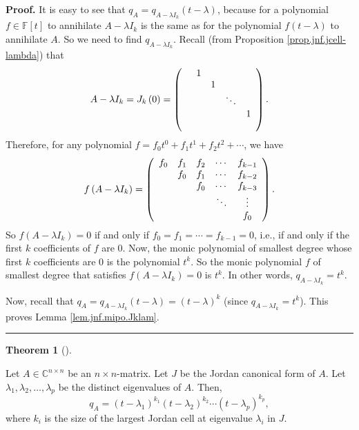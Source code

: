 \documentclass[numbers=enddot,12pt,final,onecolumn,notitlepage]{scrartcl}%
\numberwithin{exer}{subsection}
\theoremstyle{definition}
\newtheorem{theo}{Theorem}[subsection]
\newenvironment{theorem}[1][]
{\begin{theo}[#1]\begin{leftbar}}
{\end{leftbar}\end{theo}}
\newenvironment{proof}[1][Proof]{\noindent\textbf{#1.} }{\ \rule{0.5em}{0.5em}}
\begin{document}
\begin{proof}
It is easy to see that $q_{A}=q_{A-\lambda I_{k}}\left(  t-\lambda\right)  $,
because for a polynomial $f\in\mathbb{F}\left[  t\right]  $ to annihilate
$A-\lambda I_{k}$ is the same as for the polynomial $f\left(  t-\lambda
\right)  $ to annihilate $A$. So we need to find $q_{A-\lambda I_{k}}$. Recall
(from Proposition \ref{prop.jnf.jcell-lambda}) that
\[
A-\lambda I_{k}=J_{k}\left(  0\right)  =\left(
\begin{array}
[c]{ccccc}
& 1 &  &  & \\
&  & 1 &  & \\
&  &  & \ddots & \\
&  &  &  & 1\\
&  &  &  &
\end{array}
\right)  .
\]
Therefore, for any polynomial $f=f_{0}t^{0}+f_{1}t^{1}+f_{2}t^{2}+\cdots$, we
have%
\[
f\left(  A-\lambda I_{k}\right)  =\left(
\begin{array}
[c]{ccccc}%
f_{0} & f_{1} & f_{2} & \cdots & f_{k-1}\\
& f_{0} & f_{1} & \cdots & f_{k-2}\\
&  & f_{0} & \cdots & f_{k-3}\\
&  &  & \ddots & \vdots\\
&  &  &  & f_{0}%
\end{array}
\right)  .
\]
So $f\left(  A-\lambda I_{k}\right)  =0$ if and only if $f_{0}=f_{1}%
=\cdots=f_{k-1}=0$, i.e., if and only if the first $k$ coefficients of $f$ are
$0$. Now, the monic polynomial of smallest degree whose first $k$ coefficients
are $0$ is the polynomial $t^{k}$. So the monic polynomial $f$ of smallest
degree that satisfies $f\left(  A-\lambda I_{k}\right)  =0$ is $t^{k}$. In
other words, $q_{A-\lambda I_{k}}=t^{k}$.

Now, recall that $q_{A}=q_{A-\lambda I_{k}}\left(  t-\lambda\right)  =\left(
t-\lambda\right)  ^{k}$ (since $q_{A-\lambda I_{k}}=t^{k}$). This proves Lemma
\ref{lem.jnf.mipo.Jklam}.
\end{proof}

\begin{theorem}
\label{thm.jnf.mipo.jnf}Let $A\in\mathbb{C}^{n\times n}$ be an $n\times
n$-matrix. Let $J$ be the Jordan canonical form of $A$. Let $\lambda
_{1},\lambda_{2},\ldots,\lambda_{p}$ be the distinct eigenvalues of $A$. Then,%
\[
q_{A}=\left(  t-\lambda_{1}\right)  ^{k_{1}}\left(  t-\lambda_{2}\right)
^{k_{2}}\cdots\left(  t-\lambda_{p}\right)  ^{k_{p}},
\]
where $k_{i}$ is the size of the largest Jordan cell at eigenvalue
$\lambda_{i}$ in $J$.
\end{theorem}
\end{document}
